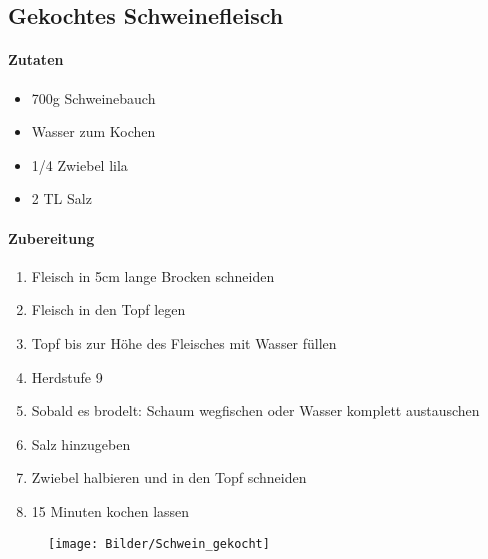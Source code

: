 \subsection{Gekochtes Schweinefleisch}
\paragraph{Zutaten}
\begin{itemize}[noitemsep]
	\item 700g Schweinebauch
	\item Wasser zum Kochen
	\item 1/4 Zwiebel lila
	\item 2 TL Salz
\end{itemize}
\paragraph{Zubereitung}
\begin{enumerate}[noitemsep]
	\item Fleisch in 5cm lange Brocken schneiden
	\item Fleisch in den Topf legen
	\item Topf bis zur Höhe des Fleisches mit Wasser füllen
	\item Herdstufe 9
	\item Sobald es brodelt: Schaum wegfischen oder Wasser komplett austauschen
	\item Salz hinzugeben
	\item Zwiebel halbieren und in den Topf schneiden
	\item 15 Minuten kochen lassen
\end{enumerate}
\vspace{1.5cm}
\begin{figure}[h]
\centering
\texttt{[image: Bilder/Schwein\_gekocht]}
\end{figure}